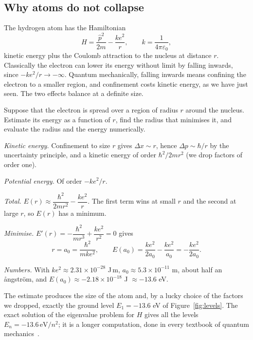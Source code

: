 \subsection{Why atoms do not collapse}

The hydrogen atom has the Hamiltonian
\[
  H=\frac{\hat p^2}{2m}-\frac{ke^2}{r},\qquad k=\frac1{4\pi\varepsilon_0},
\]
kinetic energy plus the Coulomb attraction to the nucleus at distance $r$. Classically the electron can lower its energy without limit by falling inwards, since $-ke^2/r\to-\infty$. Quantum mechanically, falling inwards means confining the electron to a smaller region, and confinement costs kinetic energy, as we have just seen. The two effects balance at a definite size.

\begin{example}\label{ex:hydrogen-estimate}
  Suppose that the electron is spread over a region of radius $r$ around the nucleus. Estimate its energy as a function of $r$, find the radius that minimises it, and evaluate the radius and the energy numerically.
\end{example}
\begin{solution}
  \begin{steps}
    \item \emph{Kinetic energy.} Confinement to size $r$ gives $\Delta x\sim r$, hence $\Delta p\sim\hbar/r$ by the uncertainty principle, and a kinetic energy of order $\hbar^2/2mr^2$ (we drop factors of order one).
    \item \emph{Potential energy.} Of order $-ke^2/r$.
    \item \emph{Total.} $E(r)\approx\dfrac{\hbar^2}{2mr^2}-\dfrac{ke^2}{r}$. The first term wins at small $r$ and the second at large $r$, so $E(r)$ has a minimum.
    \item \emph{Minimise.} $E'(r)=-\dfrac{\hbar^2}{mr^3}+\dfrac{ke^2}{r^2}=0$ gives
      \[
        r=a_0=\frac{\hbar^2}{mke^2},\qquad E(a_0)=\frac{ke^2}{2a_0}-\frac{ke^2}{a_0}=-\frac{ke^2}{2a_0}.
      \]
    \item \emph{Numbers.} With $ke^2\approx2.31\times10^{-28}$ J\,m, $a_0\approx5.3\times10^{-11}$ m, about half an \aa ngstr\"om, and $E(a_0)\approx-2.18\times10^{-18}$ J $\approx-13.6$ eV.
  \end{steps}
  The estimate produces the size of the atom and, by a lucky choice of the factors we dropped, exactly the ground level $E_1=-13.6$ eV of Figure~\ref{fig:levels}. The exact solution of the eigenvalue problem for $H$ gives all the levels $E_n=-13.6\,\mathrm{eV}/n^2$; it is a longer computation, done in every textbook of quantum mechanics~\cite{griffiths2018}.
\end{solution}

